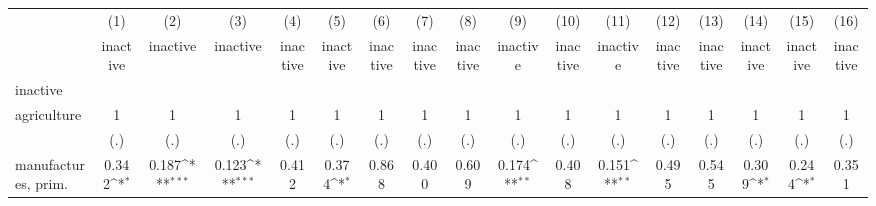 {
\def\sym#1{\ifmmode^{#1}\else\(^{#1}\)\fi}
\begin{tabular}{l*{16}{c}}
\hline\hline
                    &\multicolumn{1}{c}{(1)}&\multicolumn{1}{c}{(2)}&\multicolumn{1}{c}{(3)}&\multicolumn{1}{c}{(4)}&\multicolumn{1}{c}{(5)}&\multicolumn{1}{c}{(6)}&\multicolumn{1}{c}{(7)}&\multicolumn{1}{c}{(8)}&\multicolumn{1}{c}{(9)}&\multicolumn{1}{c}{(10)}&\multicolumn{1}{c}{(11)}&\multicolumn{1}{c}{(12)}&\multicolumn{1}{c}{(13)}&\multicolumn{1}{c}{(14)}&\multicolumn{1}{c}{(15)}&\multicolumn{1}{c}{(16)}\\
                    &\multicolumn{1}{c}{inactive}&\multicolumn{1}{c}{inactive}&\multicolumn{1}{c}{inactive}&\multicolumn{1}{c}{inactive}&\multicolumn{1}{c}{inactive}&\multicolumn{1}{c}{inactive}&\multicolumn{1}{c}{inactive}&\multicolumn{1}{c}{inactive}&\multicolumn{1}{c}{inactive}&\multicolumn{1}{c}{inactive}&\multicolumn{1}{c}{inactive}&\multicolumn{1}{c}{inactive}&\multicolumn{1}{c}{inactive}&\multicolumn{1}{c}{inactive}&\multicolumn{1}{c}{inactive}&\multicolumn{1}{c}{inactive}\\
\hline
inactive            &                     &                     &                     &                     &                     &                     &                     &                     &                     &                     &                     &                     &                     &                     &                     &                     \\
agriculture         &           1         &           1         &           1         &           1         &           1         &           1         &           1         &           1         &           1         &           1         &           1         &           1         &           1         &           1         &           1         &           1         \\
                    &         (.)         &         (.)         &         (.)         &         (.)         &         (.)         &         (.)         &         (.)         &         (.)         &         (.)         &         (.)         &         (.)         &         (.)         &         (.)         &         (.)         &         (.)         &         (.)         \\
[1em]
manufactures, prim. &       0.342\sym{*}  &       0.187\sym{***}&       0.123\sym{***}&       0.412         &       0.374\sym{*}  &       0.868         &       0.400         &       0.609         &       0.174\sym{**} &       0.408         &       0.151\sym{**} &       0.495         &       0.545         &       0.309\sym{*}  &       0.244\sym{*}  &       0.351         \\

\end{tabular}}
